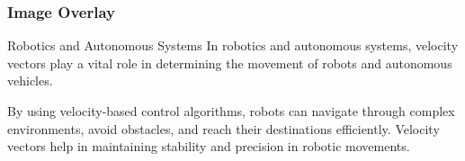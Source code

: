 \documentclass{beamer}
\begin{document}
\begin{frame}[plain]
        \frametitle{Image Overlay}
    
\end{frame}

\begin{frame}[t]{Robotics and Autonomous Systems}
\vspace{15pt}
In robotics and autonomous systems, velocity vectors play a vital role in determining the movement of robots and autonomous vehicles.

By using velocity-based control algorithms, robots can navigate through complex environments, avoid obstacles, and reach their destinations efficiently. Velocity vectors help in maintaining stability and precision in robotic movements.
\end{frame}
\end{document}
